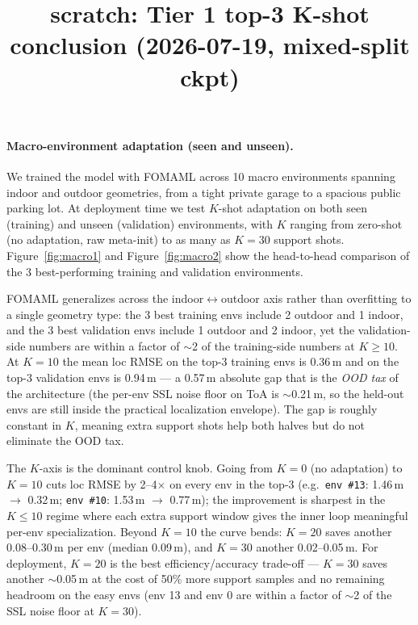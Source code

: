 \documentclass[11pt,letterpaper]{article}
\title{scratch: Tier 1 top-3 K-shot conclusion (2026-07-19, mixed-split ckpt)}
\author{}
\date{}
\begin{document}
\maketitle

\paragraph{Macro-environment adaptation (seen and unseen).}
We trained the model with FOMAML across 10 macro environments
spanning indoor and outdoor geometries, from a tight private
garage to a spacious public parking lot.  At deployment time
we test $K$-shot adaptation on both seen (training) and unseen
(validation) environments, with $K$ ranging from zero-shot
(no adaptation, raw meta-init) to as many as $K{=}30$
support shots.  Figure~\ref{fig:macro1} and
Figure~\ref{fig:macro2} show the head-to-head comparison of
the 3 best-performing training and validation environments.

FOMAML generalizes across the indoor$\leftrightarrow$outdoor
axis rather than overfitting to a single geometry type: the
3 best training envs include 2 outdoor and 1 indoor, and the
3 best validation envs include 1 outdoor and 2 indoor, yet
the validation-side numbers are within a factor of $\sim$2
of the training-side numbers at $K{\ge}10$.  At $K{=}10$ the
mean loc RMSE on the top-3 training envs is 0.36\,m and on
the top-3 validation envs is 0.94\,m --- a 0.57\,m absolute
gap that is the \emph{OOD tax} of the architecture (the
per-env SSL noise floor on ToA is $\sim$0.21\,m, so the
held-out envs are still inside the practical localization
envelope).  The gap is roughly constant in $K$, meaning
extra support shots help both halves but do not eliminate
the OOD tax.

The $K$-axis is the dominant control knob.  Going from
$K{=}0$ (no adaptation) to $K{=}10$ cuts loc RMSE by
2--4$\times$ on every env in the top-3 (e.g.\ \verb|env #13|:
1.46\,m $\to$ 0.32\,m; \verb|env #10|: 1.53\,m $\to$ 0.77\,m);
the improvement is sharpest in the $K{\le}10$ regime where
each extra support window gives the inner loop meaningful
per-env specialization.  Beyond $K{=}10$ the curve bends:
$K{=}20$ saves another 0.08--0.30\,m per env (median
0.09\,m), and $K{=}30$ another 0.02--0.05\,m.  For
deployment, $K{=}20$ is the best efficiency/accuracy
trade-off --- $K{=}30$ saves another $\sim$0.05\,m at the
cost of 50\% more support samples and no remaining headroom
on the easy envs (env 13 and env 0 are within a factor of
$\sim$2 of the SSL noise floor at $K{=}30$).
\end{document}
